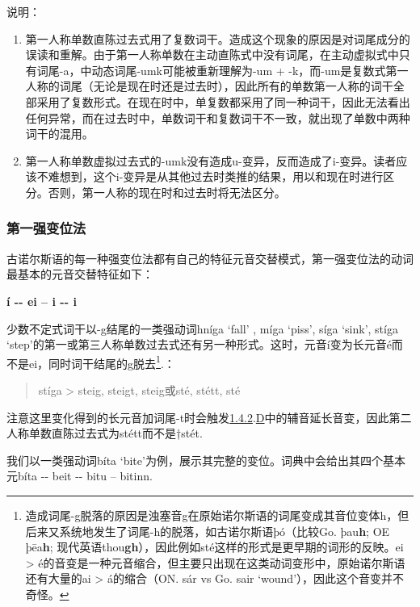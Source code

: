 说明：

\begin{enumerate}
\def\labelenumi{\arabic{enumi})}
\item
  \label{_Ref117719619}{}第一人称单数直陈过去式用了复数词干。造成这个现象的原因是对词尾成分的误读和重解。由于第一人称单数在主动直陈式中没有词尾，在主动虚拟式中只有词尾-a，中动态词尾-umk可能被重新理解为-um
  +
  -k，而-um是复数式第一人称的词尾（无论是现在时还是过去时），因此所有的单数第一人称的词干全部采用了复数形式。在现在时中，单复数都采用了同一种词干，因此无法看出任何异常，而在过去时中，单数词干和复数词干不一致，就出现了单数中两种词干的混用。
\item
  第一人称单数虚拟过去式的-umk没有造成u-变异，反而造成了i-变异。读者应该不难想到，这个i-变异是从其他过去时类推的结果，用以和现在时进行区分。否则，第一人称的现在时和过去时将无法区分。
\end{enumerate}

\subsubsection{第一强变位法}\label{ux7b2cux4e00ux5f3aux53d8ux4f4dux6cd5}

古诺尔斯语的每一种强变位法都有自己的特征元音交替模式，第一强变位法的动词最基本的元音交替特征如下：

\textbf{í -\/- ei -- i -\/- i}

少数不定式词干以-g结尾的一类强动词hníga `fall' , míga `piss', síga
`sink', stíga
`step'的第一或第三人称单数过去式还有另一种形式。这时，元音í变为长元音é而不是ei，同时词干结尾的g脱去\footnote{造成词尾-g脱落的原因是浊塞音g在原始诺尔斯语的词尾变成其音位变体h，但后来又系统地发生了词尾-h的脱落，如古诺尔斯语þó（比较Go.
  þau\textbf{h}; OE þēa\textbf{h};
  现代英语thou\textbf{gh}），因此例如sté这样的形式是更早期的词形的反映。ei
  \textgreater{}
  é的音变是一种元音缩合，但主要只出现在这类动词变形中，原始诺尔斯语还有大量的ai
  \textgreater{} á的缩合（ON. sár vs Go. sair
  `wound'），因此这个音变并不奇怪。}.：

\begin{quote}
stíga \textgreater{} steig, steigt, steig或sté, stétt, sté
\end{quote}

注意这里变化得到的长元音加词尾-t时会触发\hyperref[ux8f85ux97f3ux7684ux97f3ux53d8]{1.4.2}.\hyperref[_Ref116211616]{D}中的辅音延长音变，因此第二人称单数直陈过去式为stétt而不是†stét.

我们以一类强动词bíta
`bite'为例，展示其完整的变位。词典中会给出其四个基本元bíta -\/- beit
-\/- bitu -- bitinn.

